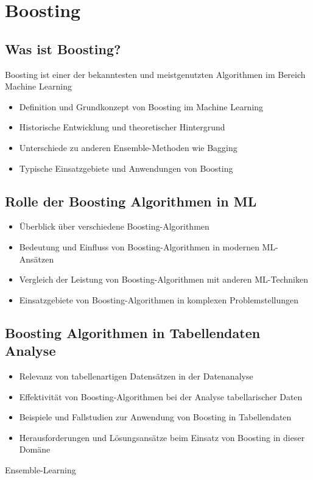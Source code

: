 \section{Boosting}

\subsection{Was ist Boosting?}
Boosting ist einer der bekanntesten und meistgenutzten Algorithmen im Bereich Machine Learning

\begin{itemize}
    \item Definition und Grundkonzept von Boosting im Machine Learning
    \item Historische Entwicklung und theoretischer Hintergrund
    \item Unterschiede zu anderen Ensemble-Methoden wie Bagging
    \item Typische Einsatzgebiete und Anwendungen von Boosting
\end{itemize}

\subsection{Rolle der Boosting Algorithmen in ML}
\begin{itemize}
    \item Überblick über verschiedene Boosting-Algorithmen
    \item Bedeutung und Einfluss von Boosting-Algorithmen in modernen ML-Ansätzen
    \item Vergleich der Leistung von Boosting-Algorithmen mit anderen ML-Techniken
    \item Einsatzgebiete von Boosting-Algorithmen in komplexen Problemstellungen
\end{itemize}

\subsection{Boosting Algorithmen in Tabellendaten Analyse}
\begin{itemize}
    \item Relevanz von tabellenartigen Datensätzen in der Datenanalyse
    \item Effektivität von Boosting-Algorithmen bei der Analyse tabellarischer Daten
    \item Beispiele und Fallstudien zur Anwendung von Boosting in Tabellendaten
    \item Herausforderungen und Lösungsansätze beim Einsatz von Boosting in dieser Domäne
\end{itemize}

Ensemble-Learning\cite{ibmBoosting}